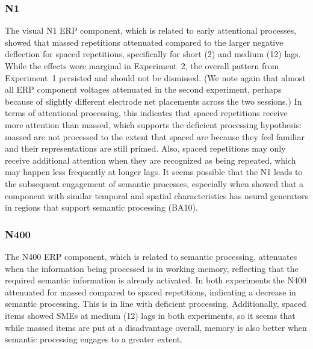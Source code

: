 

\subsubsection{N1}


The visual N1 ERP component, which is related to early attentional processes, showed that massed repetitions attenuated compared to the larger negative deflection for spaced repetitions, specifically for short (2) and medium (12) lags.  While the effects were marginal in Experiment~2, the overall pattern from Experiment~1 persisted and should not be dismissed. (We note again that almost all ERP component voltages attenuated in the second experiment, perhaps because of slightly different electrode net placements across the two sessions.)  In terms of attentional processing, this indicates that spaced repetitions receive more attention than massed, which supports the deficient processing hypothesis: massed are not processed to the extent that spaced are because they feel familiar and their representations are still primed.  Also, spaced repetitions may only receive additional attention when they are recognized as being repeated, which may happen less frequently at longer lags.  It seems possible that the N1 leads to the subsequent engagement of semantic processes, especially when  showed that a component with similar temporal and spatial characteristics has neural generators in regions that support semantic processing (BA10).

\subsubsection{N400}


The N400 ERP component, which is related to semantic processing, attenuates when the information being processed is in working memory, reflecting that the required semantic information is already activated.  In both experiments the N400 attenuated for massed compared to spaced repetitions, indicating a decrease in semantic processing.  This is in line with deficient processing. 
Additionally, spaced items showed SMEs at medium (12) lags in both experiments, so it seems that while massed items are put at a disadvantage overall, memory is also better when semantic processing engages to a greater extent.

